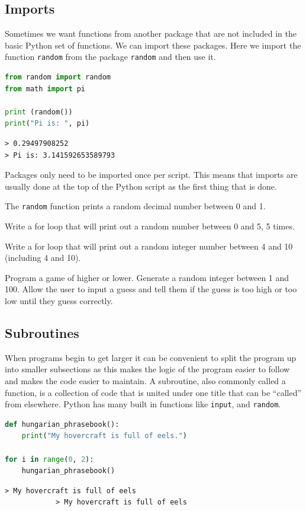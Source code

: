 	\subsection{Imports}
		Sometimes we want functions from another package that are not included in the basic Python set of functions. We can import these packages. Here we import the function \texttt{random} from the package \texttt{random} and then use it.
		\begin{lstlisting}[language=Python]
from random import random
from math import pi

print (random())
print("Pi is: ", pi)\end{lstlisting}
		\begin{verbatim}
> 0.29497908252
> Pi is: 3.141592653589793\end{verbatim}
		Packages only need to be imported once per script. This means that imports are usually done at the top of the Python script as the first thing that is done.
		
		The \texttt{random} function prints a random decimal number between 0 and 1.
		\begin{task}Write a for loop that will print out a random number between 0 and 5, 5 times.\end{task}
		\begin{task}Write a for loop that will print out a random integer number between 4 and 10 (including 4 and 10).\end{task}
		\begin{task}Program a game of higher or lower. Generate a random integer between 1 and 100. Allow the user to input a guess and tell them if the guess is too high or too low until they guess correctly.\end{task}		

	\subsection{Subroutines}
			When programs begin to get larger it can be convenient to split the program up into smaller subsections as this makes the logic of the program easier to follow and makes the code easier to maintain. A subroutine, also commonly called a function, is a collection of code that is united under one title that can be ``called'' from elsewhere. Python has many built in functions like \texttt{input}, and \texttt{random}.
			\begin{lstlisting}[language=Python]
def hungarian_phrasebook():
	print("My hovercraft is full of eels.")

for i in range(0, 2):
	hungarian_phrasebook()\end{lstlisting}
			\begin{verbatim}> My hovercraft is full of eels
			> My hovercraft is full of eels
			\end{verbatim}

